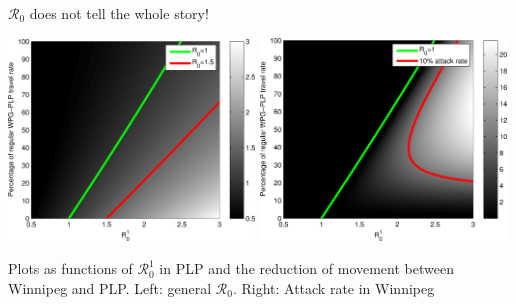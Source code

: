 \documentclass[aspectratio=169]{beamer}\usepackage[]{graphicx}\usepackage[]{xcolor}
\begin{document}
\begin{frame}{$\mathcal{R}_0$ does not tell the whole story!}
\begin{center}
	\includegraphics[width=0.49\textwidth]{FIGS/invasion_WPG_from_satellites_R01_m_caseR0W05_R0}
	\includegraphics[width=0.49\textwidth]{FIGS/invasion_WPG_from_satellites_R01_m_caseR0W05_attackRate}
\end{center}
\vfill
Plots as functions of $\mathcal{R}_0^1$ in PLP and the reduction of movement between Winnipeg and PLP. Left: general $\mathcal{R}_0$. Right: Attack rate in Winnipeg
\end{frame}



\end{document}
